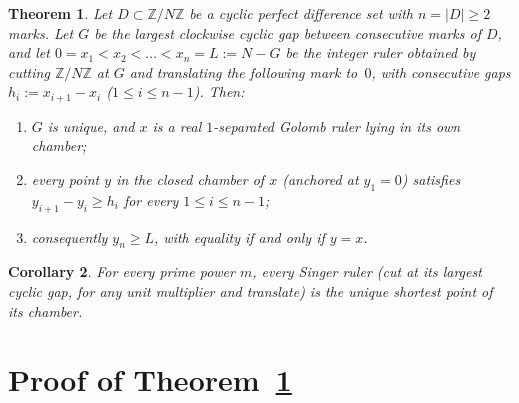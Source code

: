 \documentclass[11pt]{article}
\newtheorem{theorem}{Theorem}
\newtheorem{corollary}[theorem]{Corollary}
\begin{document}
\begin{theorem}\label{thm:pds}
Let $D \subset \mathbb{Z}/N\mathbb{Z}$ be a cyclic perfect difference set with $n = |D| \ge 2$ marks. Let $G$ be the largest clockwise cyclic gap between consecutive marks of $D$, and let $0 = x_1 < x_2 < \dots < x_n = L := N - G$ be the integer ruler obtained by cutting $\mathbb{Z}/N\mathbb{Z}$ at $G$ and translating the following mark to~$0$, with consecutive gaps $h_i := x_{i+1} - x_i$ ($1 \le i \le n - 1$). Then:
\begin{enumerate}
\item $G$ is unique, and $x$ is a real $1$-separated Golomb ruler lying in its own chamber;
\item every point $y$ in the closed chamber of $x$ (anchored at $y_1 = 0$) satisfies $y_{i+1} - y_i \ge h_i$ for every $1 \le i \le n - 1$;
\item consequently $y_n \ge L$, with equality if and only if $y = x$.
\end{enumerate}
\end{theorem}

\begin{corollary}
For every prime power $m$, every Singer ruler (cut at its largest cyclic gap, for any unit multiplier and translate) is the unique shortest point of its chamber.
\end{corollary}

\section{Proof of Theorem~\ref{thm:pds}}
\end{document}
